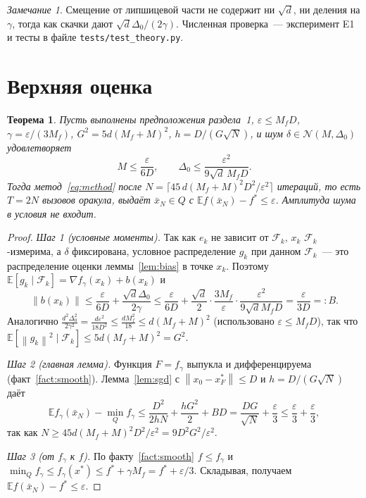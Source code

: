 \documentclass[12pt,a4paper]{article}
\theoremstyle{plain}
\newtheorem{theorem}{Теорема}
\theoremstyle{definition}
\theoremstyle{remark}
\newtheorem*{remark}{Замечание}
\newcommand{\E}{\mathbb{E}}
\newcommand{\eps}{\varepsilon}
\newcommand{\norm}[1]{\left\lVert #1\right\rVert}
\newcommand{\F}{\mathcal F}
\begin{document}
\begin{remark}
Смещение от липшицевой части не содержит ни $\sqrt d$, ни деления на $\gamma$, тогда как скачки дают $\sqrt d\Delta_0/(2\gamma)$. Численная проверка~--- эксперимент E1 и тесты в файле \texttt{tests/\allowbreak test\_theory.py}.
\end{remark}

\section{Верхняя оценка}

\begin{theorem}\label{th:upper}
Пусть выполнены предположения раздела~1, $\eps\le M_fD$, $\gamma=\eps/(3M_f)$, $G^2=5d(M_f+M)^2$, $h=D/(G\sqrt N)$, и шум $\delta\in\mathcal N(M,\Delta_0)$ удовлетворяет
\begin{equation}\label{eq:upper-cond}
  M\le\frac{\eps}{6D},\qquad\Delta_0\le\frac{\eps^2}{9\sqrt d\,M_fD}.
\end{equation}
Тогда метод~\eqref{eq:method} после $N=\lceil45\,d(M_f+M)^2D^2/\eps^2\rceil$ итераций, то есть $T=2N$ вызовов оракула, выдаёт $\bar x_N\in Q$ с $\E f(\bar x_N)-f^*\le\eps$. Амплитуда шума в условия не входит.
\end{theorem}
\begin{proof}
\emph{Шаг 1 (условные моменты).} Так как $e_k$ не зависит от $\F_k$, $x_k$ $\F_k$-измерима, а $\delta$ фиксирована, условное распределение $g_k$ при данном $\F_k$~--- это распределение оценки леммы~\ref{lem:bias} в точке $x_k$. Поэтому $\E[g_k\mid\F_k]=\nabla f_\gamma(x_k)+b(x_k)$ и
\[
  \norm{b(x_k)}\le\frac\eps{6D}+\frac{\sqrt d\Delta_0}{2\gamma}\le\frac\eps{6D}+\frac{\sqrt d}{2}\cdot\frac{3M_f}{\eps}\cdot\frac{\eps^2}{9\sqrt dM_fD}=\frac\eps{3D}=:B .
\]
Аналогично $\frac{d^2\Delta_0^2}{2\gamma^2}=\frac{d\eps^2}{18D^2}\le\frac{dM_f^2}{18}\le d(M_f+M)^2$ (использовано $\eps\le M_fD$), так что $\E[\norm{g_k}^2\mid\F_k]\le5d(M_f+M)^2=G^2$.

\emph{Шаг 2 (главная лемма).} Функция $F=f_\gamma$ выпукла и дифференцируема (факт~\ref{fact:smooth}). Лемма~\ref{lem:sgd} с $\norm{x_0-x^*_F}\le D$ и $h=D/(G\sqrt N)$ даёт
\[
  \E f_\gamma(\bar x_N)-\min_Qf_\gamma\le\frac{D^2}{2hN}+\frac{hG^2}{2}+BD=\frac{DG}{\sqrt N}+\frac\eps3\le\frac\eps3+\frac\eps3,
\]
так как $N\ge45d(M_f+M)^2D^2/\eps^2=9D^2G^2/\eps^2$.

\emph{Шаг 3 (от $f_\gamma$ к $f$).} По факту~\ref{fact:smooth} $f\le f_\gamma$ и $\min_Qf_\gamma\le f_\gamma(x^*)\le f^*+\gamma M_f=f^*+\eps/3$. Складывая, получаем $\E f(\bar x_N)-f^*\le\eps$.
\end{proof}
\end{document}

